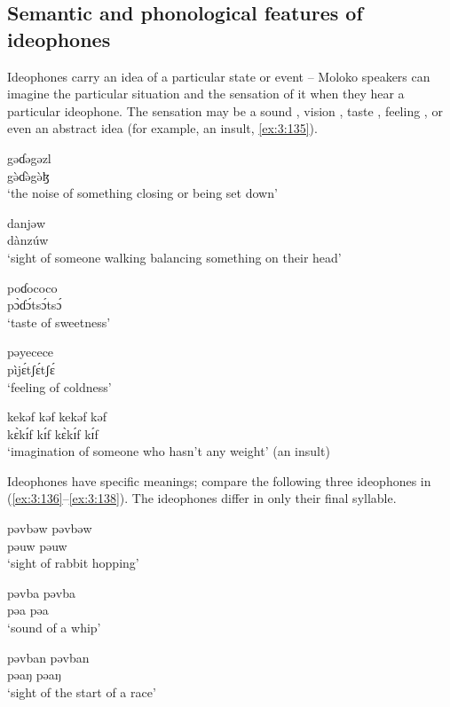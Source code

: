 \subsection{Semantic and phonological features of ideophones}\label{sec:3.6.1}
\hypertarget{RefHeading1211261525720847}{}
Ideophones carry an idea of a particular state or event -- Moloko speakers can imagine the particular situation and the sensation of it when they hear a particular ideophone. The sensation may be a sound , vision , taste , feeling , or even an abstract idea (for example, an insult, \ref{ex:3:135}). 

\ea \label{ex:3:131}
\gll gəɗəgəzl\\
  g\`{ə}ɗ\`{ə}g\`{ə}ɮ\\
\glt  ‘the noise of something closing or being set down’
\z

\ea \label{ex:3:132}
\gll danjəw\\
  dànzúw\\
\glt  ‘sight of someone walking balancing something on their head’
\z

\ea \label{ex:3:133}
\gll poɗococo\\
  p\`{ɔ}ɗ\'{ɔ}ts\'{ɔ}ts\'{ɔ}\\
\glt  ‘taste of sweetness’
\z

\ea \label{ex:3:134}
\gll pəyecece\\
  pìj\'{ɛ}tʃ\'{ɛ}tʃ\'{ɛ}\\
\glt  ‘feeling of coldness’
\z

\ea \label{ex:3:135}
\gll kekəf  kəf  kekəf  kəf\\
  k\`{ɛ}k\'{ɪ}f    k\'{ɪ}f      k\`{ɛ}k\'{ɪ}f  k\'{ɪ}f\\
\glt  ‘imagination of someone who hasn’t any weight’ (an insult)
\z

Ideophones have specific meanings; compare the following three ideophones in (\ref{ex:3:136}--\ref{ex:3:138}). The ideophones differ in only their final syllable.

\ea \label{ex:3:136}
\gll pəvbəw pəvbəw\\
  pə\dentalflap uw pə\dentalflap uw\\
\glt  ‘sight of rabbit hopping’
\z

\ea \label{ex:3:137}
\gll pəvba  pəvba\\
  pə\dentalflap a  pə\dentalflap a\\
\glt  ‘sound of a whip’
\z

\ea \label{ex:3:138}
\gll pəvban  pəvban\\
  pə\dentalflap aŋ  pə\dentalflap aŋ\\
\glt  ‘sight of the start of a race’
\z


